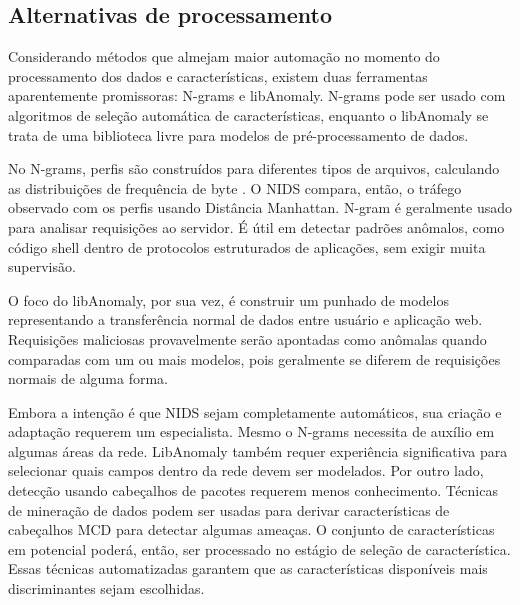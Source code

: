 \subsection{Alternativas de processamento}
Considerando métodos que almejam maior automação no momento do processamento dos dados e características, existem
duas ferramentas aparentemente promissoras: N-grams e libAnomaly. N-grams pode ser usado com algoritmos de seleção
automática de características, enquanto o libAnomaly se trata de uma biblioteca livre para modelos de pré-processamento
de dados.
\par No N-grams, perfis são construídos para diferentes tipos de arquivos, calculando as distribuições de frequência
de byte \cite{zhuowei03}. O NIDS compara, então, o tráfego observado com os perfis usando Distância Manhattan. N-gram é geralmente
usado para analisar requisições ao servidor. É útil em detectar padrões anômalos, como código shell dentro de
protocolos estruturados de aplicações, sem exigir muita supervisão.
\par O foco do libAnomaly, por sua vez, é construir um punhado de modelos representando a transferência normal de
dados entre usuário e aplicação web. Requisições maliciosas provavelmente serão apontadas como anômalas quando
comparadas com um ou mais modelos, pois geralmente se diferem de requisições normais de alguma forma.
\par Embora a intenção é que NIDS sejam completamente automáticos, sua criação e adaptação requerem um especialista.
Mesmo o N-grams necessita de auxílio em algumas áreas da rede. LibAnomaly também requer experiência significativa
para selecionar quais campos dentro da rede devem ser modelados. Por outro lado, detecção usando cabeçalhos de
pacotes requerem menos conhecimento. Técnicas de mineração de dados podem ser usadas para derivar características de
cabeçalhos MCD para detectar algumas ameaças. O conjunto de características em potencial  poderá, então, ser processado no
estágio de seleção de característica. Essas técnicas automatizadas garantem que as características disponíveis mais discriminantes sejam
escolhidas.
